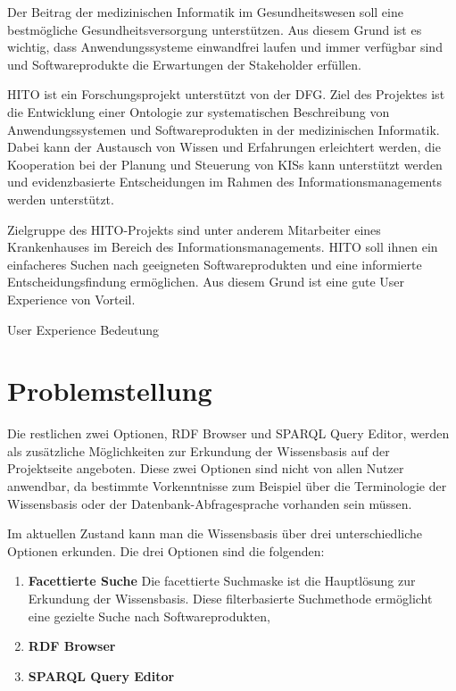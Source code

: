 
Der Beitrag der medizinischen Informatik im Gesundheitswesen soll eine bestmögliche Gesundheitsversorgung unterstützen.
Aus diesem Grund ist es wichtig, dass Anwendungssysteme einwandfrei laufen und immer verfügbar sind und Softwareprodukte die Erwartungen der Stakeholder erfüllen.

\ac{HITO} ist ein Forschungsprojekt unterstützt von der \ac{DFG}.
Ziel des Projektes ist die Entwicklung einer Ontologie zur systematischen Beschreibung von Anwendungssystemen und Softwareprodukten in der medizinischen Informatik.
Dabei kann der Austausch von Wissen und Erfahrungen erleichtert werden, die Kooperation bei der Planung und Steuerung von \acp{KIS} kann unterstützt werden und evidenzbasierte Entscheidungen im Rahmen des Informationsmanagements werden unterstützt.

Zielgruppe des HITO-Projekts sind unter anderem Mitarbeiter eines Krankenhauses im Bereich des Informationsmanagements. HITO soll ihnen ein einfacheres Suchen nach geeigneten Softwareprodukten und eine informierte Entscheidungsfindung ermöglichen. Aus diesem Grund ist eine gute User Experience von Vorteil. 

User Experience Bedeutung 

\section{Problemstellung}\label{sec:problemstellung}

Die restlichen zwei Optionen, RDF Browser und SPARQL Query Editor, werden als zusätzliche Möglichkeiten zur Erkundung der Wissensbasis auf der Projektseite angeboten.  
Diese zwei Optionen sind nicht von allen Nutzer anwendbar, da bestimmte Vorkenntnisse zum Beispiel über die Terminologie der Wissensbasis oder der Datenbank-Abfragesprache vorhanden sein müssen.

Im aktuellen Zustand kann man die Wissensbasis über drei unterschiedliche Optionen erkunden.
Die drei Optionen sind die folgenden:
\begin{enumerate}
\item \textbf{Facettierte Suche}
\newline Die facettierte Suchmaske ist die Hauptlösung zur Erkundung der Wissensbasis. Diese filterbasierte Suchmethode ermöglicht eine gezielte Suche nach Softwareprodukten, 
\item \textbf {RDF Browser}
\newline 
\item \textbf {SPARQL Query Editor }
\newline
\end{enumerate} 

